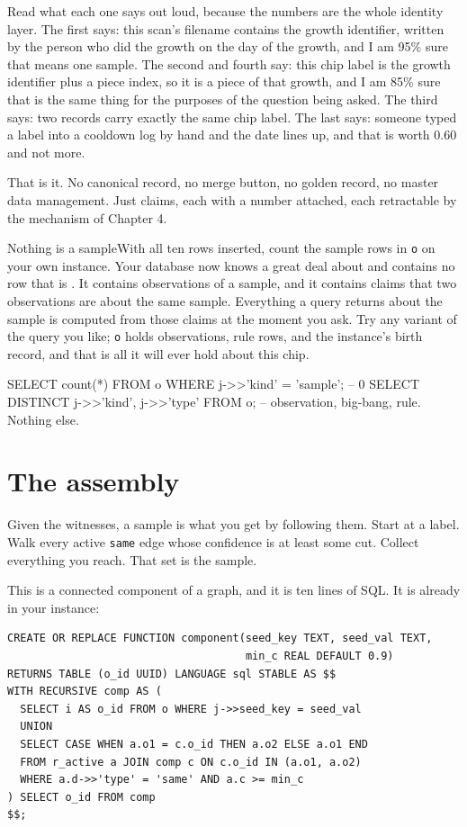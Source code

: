 Read what each one says out loud, because the numbers are the whole identity layer. The first says: this scan's filename contains the growth identifier, written by the person who did the growth on the day of the growth, and I am 95\% sure that means one sample. The second and fourth say: this chip label is the growth identifier plus a piece index, so it is a piece of that growth, and I am 85\% sure that is the same thing for the purposes of the question being asked. The third says: two records carry exactly the same chip label. The last says: someone typed a label into a cooldown log by hand and the date lines up, and that is worth 0.60 and not more.

That is it. No canonical record, no merge button, no golden record, no master data management. Just claims, each with a number attached, each retractable by the mechanism of Chapter 4.

\begin{Correspondence}{Nothing is a sample}{With all ten rows inserted, count the sample rows in \texttt{o} on your own instance.}
Your database now knows a great deal about \labSample{} and contains no row that is \labSample. It contains observations of a sample, and it contains claims that two observations are about the same sample. Everything a query returns about the sample is computed from those claims at the moment you ask. Try any variant of the query you like; \texttt{o} holds observations, rule rows, and the instance's birth record, and that is all it will ever hold about this chip.
\begin{Check}
SELECT count(*) FROM o WHERE j->>'kind' = 'sample';   -- 0
SELECT DISTINCT j->>'kind', j->>'type' FROM o;        -- observation, big-bang, rule. Nothing else.
\end{Check}
\end{Correspondence}

\section{The assembly}

Given the witnesses, a sample is what you get by following them. Start at a label. Walk every active \texttt{same} edge whose confidence is at least some cut. Collect everything you reach. That set is the sample.

This is a connected component of a graph, and it is ten lines of SQL. It is already in your instance:

\begin{lstlisting}
CREATE OR REPLACE FUNCTION component(seed_key TEXT, seed_val TEXT,
                                     min_c REAL DEFAULT 0.9)
RETURNS TABLE (o_id UUID) LANGUAGE sql STABLE AS $$
WITH RECURSIVE comp AS (
  SELECT i AS o_id FROM o WHERE j->>seed_key = seed_val
  UNION
  SELECT CASE WHEN a.o1 = c.o_id THEN a.o2 ELSE a.o1 END
  FROM r_active a JOIN comp c ON c.o_id IN (a.o1, a.o2)
  WHERE a.d->>'type' = 'same' AND a.c >= min_c
) SELECT o_id FROM comp
$$;
\end{lstlisting}


